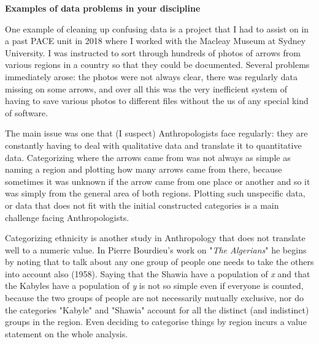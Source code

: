 \documentclass{article}
\begin{document}
\textbf{Examples of data problems in your discipline}

One example of cleaning up confusing data is a project that I had to assist on in a past PACE unit in 2018 where I worked with the Macleay Museum at Sydney University. I was instructed to sort through hundreds of photos of arrows from various regions in a country so that they could be documented. Several problems immediately arose: the photos were not always clear, there was regularly data missing on some arrows, and over all this was the very inefficient system of having to save various photos to different files without the us of any special kind of software. 

The main issue was one that (I suspect) Anthropologists face regularly: they are constantly having to deal with qualitative data and translate it to quantitative data. Categorizing where the arrows came from was not always as simple as naming a region and plotting how many arrows came from there, because sometimes it was unknown if the arrow came from one place or another and so it was simply from the general area of both regions. Plotting such unspecific data, or data that does not fit with the initial constructed categories is a main challenge facing Anthropologists.

Categorizing ethnicity is another study in Anthropology that does not translate well to a numeric value. In Pierre Bourdieu's work on "\textit{The Algerians}" he begins by noting that to talk about any one group of people one needs to take the others into account also (1958). Saying that the Shawia have a population of \textit{x} and that the Kabyles have a population of \textit{y} is not so simple even if everyone is counted, because the two groups of people are not necessarily mutually exclusive, nor do the categories "Kabyle" and "Shawia" account for all the distinct (and indistinct) groups in the region. Even deciding to categorise things by region incurs a value statement on the whole analysis.
\end{document}
